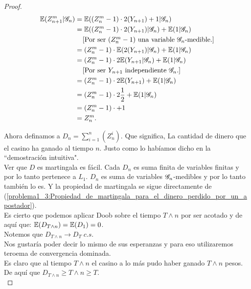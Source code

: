 \begin{proof}
		\begin{align}\label{problema1_3:Propiedad_de_martingala_para_el_dinero_perdido_por_un_apostador}
			\mathbb{E}(Z_{n+1}^{m} | \mathscr{G}_n) &= \mathbb{E}((Z_n^{m} - 1) \cdot 2(Y_{n+1}) + 1 | \mathscr{G}_n)\\
								   &= \mathbb{E}((Z_n^{m} -1) \cdot 2(Y_{n+1}) | \mathscr{G}_n) + \mathbb{E}( 1 | \mathscr{G}_n)\\
								   &\;\;\;\;\mbox{[Por ser $(Z_n^{m} - 1)$ una variable $\mathscr{G}_n$-medible.]}\\
								   &= (Z_n^{m} -1) \cdot \mathbb{E}(  2(Y_{n+1}) | \mathscr{G}_n) + \mathbb{E}( 1 | \mathscr{G}_n)\\
								   &= (Z_n^{m} -1) \cdot 2\mathbb{E}( Y_{n+1} | \mathscr{G}_n) + \mathbb{E}( 1 | \mathscr{G}_n)\\
								   &\;\;\;\;\mbox{[Por ser $Y_{n + 1}$ independiente $\mathscr{G}_n$.]}\\
								   &= (Z_n^{m} -1) \cdot 2\mathbb{E}( Y_{n+1}) + \mathbb{E}( 1 | \mathscr{G}_n)\\
								   &= (Z_n^{m} -1) \cdot 2 \frac{1}{2} + \mathbb{E}( 1 | \mathscr{G}_n)\\
								   &= (Z_n^{m} -1) \cdot + 1 \\
								   &= Z_n^m.
		\end{align}
		
		Ahora definamos a $D_n = \sum_{i=1}^n (Z_n^i)$. Que significa, La cantidad de dinero que el casino ha ganado al tiempo $n$. 
		Justo como lo habíamos dicho en la ``demostración intuitiva".\\
		
		Ver que $D$ es martingala es fácil. Cada $D_n$ es suma finita de variables finitas y por lo tanto pertenece a $L_1$.
		$D_n$ es suma de variables $\mathscr{G}_n$-medibles y por lo tanto también lo es. Y la propiedad de martingala se sigue directamente de
		(\ref{problema1_3:Propiedad_de_martingala_para_el_dinero_perdido_por_un_apostador}).\\
		
		Es cierto que podemos aplicar Doob sobre el tiempo $T \wedge n$ por ser acotado y de aquí que:
		$\mathbb{E}(D_{T \wedge n}) = \mathbb{E}(D_1) = 0$.\\
		
		Notemos que $D_{T \wedge n} \longrightarrow D_T \; c.s.$\\
		
		Nos gustaría poder decir lo mismo de sus esperanzas y para eso utilizaremos teroema de convergencia dominada.\\
		
		Es claro que al tiempo $T \wedge n$ el casino a lo más pudo haber ganado $T \wedge n$ pesos.
		De aquí que $D_{T \wedge n} \geq T \wedge n \geq T$.\\
		

\end{proof}
